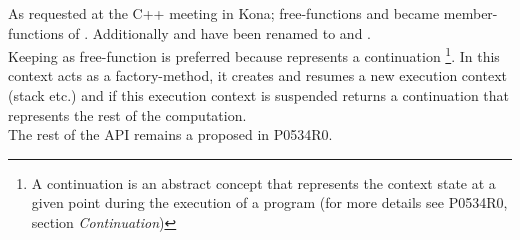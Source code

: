 
As requested at the C++ meeting in Kona; free-functions \getdata and \dataavail
became member-functions of \cont. Additionally  and
 have been renamed to \resume and
\resumewith.\\
\newline
Keeping \callcc as free-function is preferred because \cont represents a
continuation \footnote{A continuation is an abstract concept that represents the
context state at a given point during the execution of a program (for more
details see P0534R0, section \emph{Continuation}\cite{P0534R0})}.
In this context \callcc acts as a factory-method, it creates and resumes a new
execution context (stack etc.) and if this execution context is suspended
\callcc returns a continuation that represents the rest of the computation.\\
The rest of the API remains a proposed in P0534R0\cite{P0534R0}.
